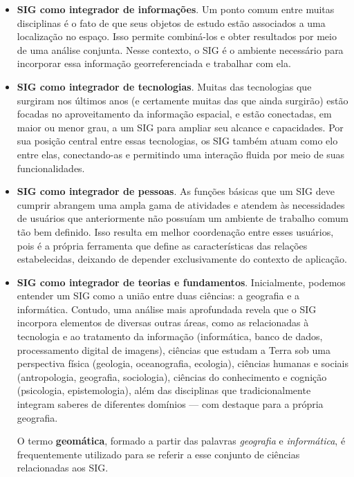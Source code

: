 \begin{itemize}
\item \textbf{SIG como integrador de informações}. Um ponto comum entre muitas disciplinas é o fato de que seus objetos de estudo estão associados a uma localização no espaço. Isso permite combiná-los e obter resultados por meio de uma análise conjunta. Nesse contexto, o SIG é o ambiente necessário para incorporar essa informação georreferenciada e trabalhar com ela.

\item \textbf{SIG como integrador de tecnologias}. Muitas das tecnologias que surgiram nos últimos anos (e certamente muitas das que ainda surgirão) estão focadas no aproveitamento da informação espacial, e estão conectadas, em maior ou menor grau, a um SIG para ampliar seu alcance e capacidades. Por sua posição central entre essas tecnologias, os SIG também atuam como elo entre elas, conectando-as e permitindo uma interação fluida por meio de suas funcionalidades.

\item \textbf{SIG como integrador de pessoas}. As funções básicas que um SIG deve cumprir abrangem uma ampla gama de atividades e atendem às necessidades de usuários que anteriormente não possuíam um ambiente de trabalho comum tão bem definido. Isso resulta em melhor coordenação entre esses usuários, pois é a própria ferramenta que define as características das relações estabelecidas, deixando de depender exclusivamente do contexto de aplicação.

\item \textbf{SIG como integrador de teorias e fundamentos}. Inicialmente, podemos entender um SIG como a união entre duas ciências: a geografia e a informática. Contudo, uma análise mais aprofundada revela que o SIG incorpora elementos de diversas outras áreas, como as relacionadas à tecnologia e ao tratamento da informação (informática, banco de dados, processamento digital de imagens), ciências que estudam a Terra sob uma perspectiva física (geologia, oceanografia, ecologia), ciências humanas e sociais (antropologia, geografia, sociologia), ciências do conhecimento e cognição (psicologia, epistemologia), além das disciplinas que tradicionalmente integram saberes de diferentes domínios — com destaque para a própria geografia.

O termo \textbf{geomática}, formado a partir das palavras \emph{geografia} e \emph{informática}, é frequentemente utilizado para se referir a esse conjunto de ciências relacionadas aos SIG.
\end{itemize}

